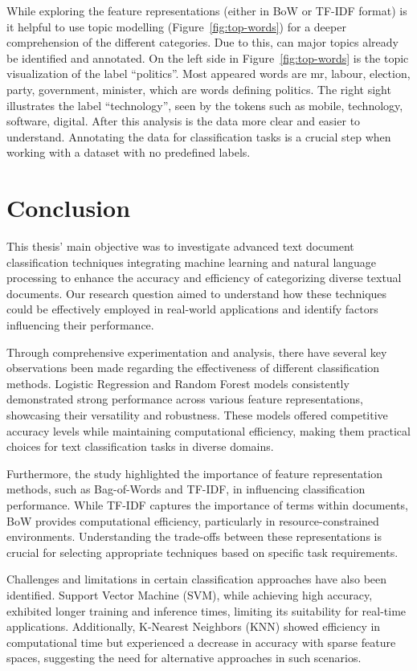 While exploring the feature representations (either in BoW or TF-IDF format) is it helpful to use topic modelling (Figure~\ref{fig:top-words}) for a deeper comprehension of the different categories. Due to this, can major topics already be identified and annotated. On the left side in Figure~\ref{fig:top-words} is the topic visualization of the label “politics”. Most appeared words are mr, labour, election, party, government, minister, which are words defining politics. The right sight illustrates the label “technology”, seen by the tokens such as mobile, technology, software, digital. After this analysis is the data more clear and easier to understand. Annotating the data for classification tasks is a crucial step when working with a dataset with no predefined labels.

\section{Conclusion}

This thesis' main objective was to investigate advanced text document classification techniques integrating machine learning and natural language processing to enhance the accuracy and efficiency of categorizing diverse textual documents. Our research question aimed to understand how these techniques could be effectively employed in real-world applications and identify factors influencing their performance.

Through comprehensive experimentation and analysis, there have several key observations been made regarding the effectiveness of different classification methods. Logistic Regression and Random Forest models consistently demonstrated strong performance across various feature representations, showcasing their versatility and robustness. These models offered competitive accuracy levels while maintaining computational efficiency, making them practical choices for text classification tasks in diverse domains.

Furthermore, the study highlighted the importance of feature representation methods, such as Bag-of-Words and TF-IDF, in influencing classification performance. While TF-IDF captures the importance of terms within documents, BoW provides computational efficiency, particularly in resource-constrained environments. Understanding the trade-offs between these representations is crucial for selecting appropriate techniques based on specific task requirements.

Challenges and limitations in certain classification approaches have also been identified. Support Vector Machine (SVM), while achieving high accuracy, exhibited longer training and inference times, limiting its suitability for real-time applications. Additionally, K-Nearest Neighbors (KNN) showed efficiency in computational time but experienced a decrease in accuracy with sparse feature spaces, suggesting the need for alternative approaches in such scenarios.

